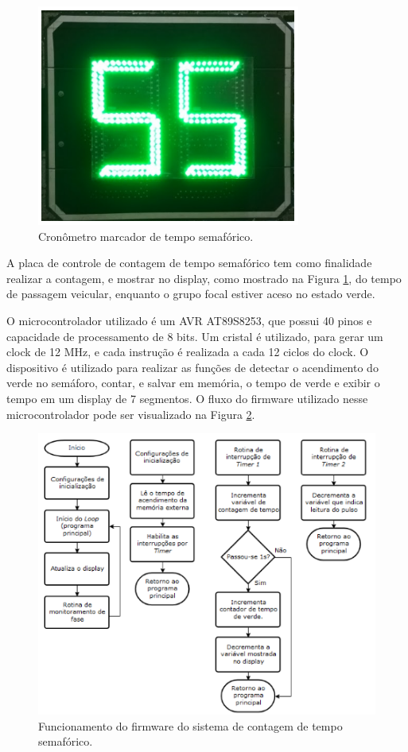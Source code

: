 \begin{figure}[ht]
    \begin{center}
    \includegraphics{figuras/cronometro.PNG}
    \end{center}
    \caption[Sistema de cronômetro]{Cronômetro marcador de tempo semafórico.}
    \label{cronometro}
\end{figure}

A placa de controle de contagem de tempo semafórico tem como finalidade realizar a contagem, e mostrar no display, como mostrado na Figura \ref{cronometro}, do tempo de passagem veicular, enquanto o grupo focal estiver aceso no estado verde.

O microcontrolador utilizado é um AVR AT89S8253, que possui 40 pinos e capacidade de processamento de 8 bits. Um cristal é utilizado, para gerar um clock de 12 MHz, e cada instrução é realizada a cada 12 ciclos do clock. O dispositivo é utilizado para realizar as funções de detectar o acendimento do verde no semáforo, contar, e salvar em memória, o tempo de verde e exibir o tempo em um display de 7 segmentos. O fluxo do firmware utilizado nesse microcontrolador pode ser visualizado na Figura \ref{fluxo_cron}.

\begin{figure}[ht]
    \begin{center}
    \includegraphics{figuras/fluxo_cron.PNG}
    \end{center}
    \caption[Fluxograma do sistema de cronômetro]{Funcionamento do firmware do sistema de contagem de tempo semafórico.}
    \label{fluxo_cron}
\end{figure}

